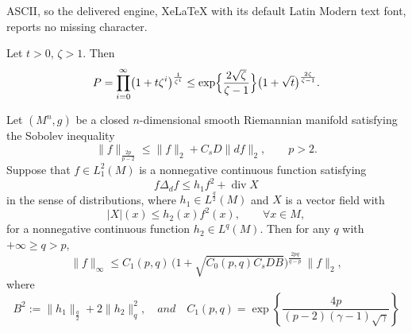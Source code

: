 \documentclass[10pt,a4paper]{amsart}
\begin{document}
ASCII, so the delivered engine, XeLaTeX with its default Latin Modern text font, reports no missing character.
	\begin{lemma}\label{lem:product-estimate}
		Let \(t > 0\), \(\zeta > 1\). Then
		\[
		P = \prod_{i=0}^{\infty} \bigl(1 + t\zeta^{i}\bigr)^{\frac{1}{\zeta^{i}}}
		\le \exp\Bigl\{\frac{2\sqrt{\zeta}}{\zeta-1}\Bigr\}
		\bigl(1+\sqrt{t}\bigr)^{\frac{2\zeta}{\zeta-1}} .
		\]
	\end{lemma}

	\begin{proposition}\label{prop:mean-value}
		Let \((M^{n},g)\) be a closed \(n\)-dimensional smooth Riemannian manifold satisfying the Sobolev inequality
		\begin{equation}\label{eq:sob-ineq}
		\|f\|_{\frac{2p}{p-2}} \le \|f\|_2 + C_s D \|df\|_2,\qquad p>2.
		\end{equation}
		Suppose that \(f \in L^2_1(M)\) is a nonnegative continuous function satisfying
		\begin{equation}\label{eq:diff-ineq}
		f\Delta_d f \le h_1 f^2 + \operatorname{div} X
		\end{equation}
		in the sense of distributions, where \(h_1 \in L^\frac{q}{2}(M)\) and \(X\) is a vector field with
		\begin{equation}\label{eq:V-bound}
		|X|(x) \le h_2(x) f^2(x), \qquad \forall x \in M,
		\end{equation}
		for a nonnegative continuous function \(h_2 \in L^{q}(M)\). Then for any \(q\) with {\(+\infty\geq q > p\)},
		\begin{equation}\label{eq:Linfty-bound}
		\|f\|_\infty \le C_1(p,q)\,
		\bigl(1 + \sqrt{C_{0}(p,q)C_s D B}\bigr)^{\frac{2pq}{q-p}}\,
		\|f\|_2,
		\end{equation}
		where 
		\[
		B^2 := \|h_1\|_\frac{q}{2} + 2\|h_2\|_{q}^2,\quad and\quad C_{1}(p,q)= \exp\left\{\frac{4p}{(p-2)(\gamma-1)\sqrt{\gamma}}\right\}
		\]
	\end{proposition}
\end{document}
